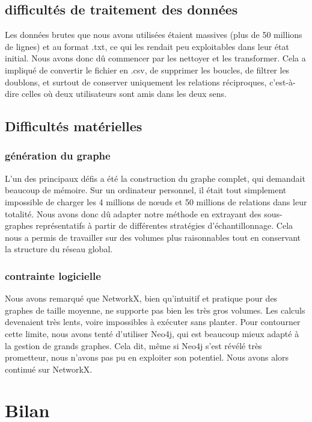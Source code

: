 \documentclass[a4paper, 12pt, twoside]{article}
\begin{document}
\subsection{difficultés de traitement des données}
Les données brutes que nous avons utilisées étaient massives (plus de 50 millions de lignes) et au format .txt, ce qui les rendait peu exploitables dans leur état initial. Nous avons donc dû commencer par les nettoyer et les transformer. Cela a impliqué de convertir le fichier en .csv, de supprimer les boucles, de filtrer les doublons, et surtout de conserver uniquement les relations réciproques, c’est-à-dire celles où deux utilisateurs sont amis dans les deux sens.

\subsection{Difficultés matérielles}

\subsubsection{génération du graphe}
L’un des principaux défis a été la construction du graphe complet, qui demandait beaucoup de mémoire. Sur un ordinateur personnel, il était tout simplement impossible de charger les 4 millions de nœuds et 50 millions de relations dans leur totalité. Nous avons donc dû adapter notre méthode en extrayant des sous-graphes représentatifs à partir de différentes stratégies d’échantillonnage. Cela nous a permis de travailler sur des volumes plus raisonnables tout en conservant la structure du réseau global.

\subsubsection{contrainte logicielle}
Nous avons remarqué que NetworkX, bien qu’intuitif et pratique pour des graphes de taille moyenne, ne supporte pas bien les très gros volumes. Les calculs devenaient très lents, voire impossibles à exécuter sans planter.
Pour contourner cette limite, nous avons tenté d’utiliser Neo4j, qui est beaucoup mieux adapté à la gestion de grands graphes. Cela dit, même si Neo4j s’est révélé très prometteur, nous n’avons pas pu en exploiter son potentiel. Nous avons alors continué sur NetworkX.

 
\section{Bilan}
\end{document}

